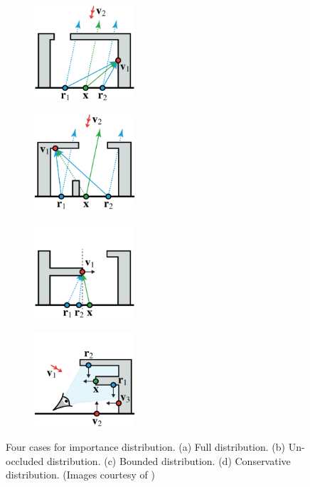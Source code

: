 \documentclass[]{book}
\begin{document}
\begin{figure}[t]
	\begin{subfigure}{0.25\textwidth}
		\centering
		\includegraphics[height=1.4in]{img/IMP_3_1.png}
		\caption{}
		\label{fig:IMP:represent:a}
	\end{subfigure}%
	\begin{subfigure}{0.25\textwidth}
		\centering
		\includegraphics[height=1.4in]{img/IMP_3_2.png}
		\caption{}
		\label{fig:IMP:represent:b}
	\end{subfigure}%
	\begin{subfigure}{0.25\textwidth}
		\centering
		\includegraphics[height=1.4in]{img/IMP_3_3.png}
		\caption{}
		\label{fig:IMP:represent:c}
	\end{subfigure}%
	\begin{subfigure}{0.25\textwidth}
		\centering
		\includegraphics[height=1.4in]{img/IMP_3_4.png}
		\caption{}
		\label{fig:IMP:represent:d}
	\end{subfigure}
	\caption[Four Distributions]{Four cases for importance distribution. (a) Full distribution. (b) Un-occluded distribution. (c) Bounded distribution. (d) Conservative distribution. (Images courtesy of \citeauthor{georgiev2012importance})}
	\label{fig:IMP:represent}
\end{figure}
\end{document}
